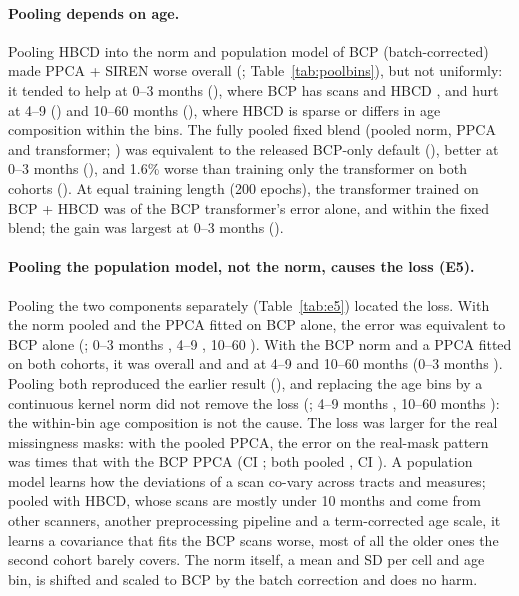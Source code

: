 \documentclass[11pt]{article}
\begin{document}
\paragraph{Pooling depends on age.} Pooling HBCD into the norm and population model of BCP (batch-corrected) made PPCA +
SIREN worse overall (\pbAAll; Table~\ref{tab:poolbins}), but not uniformly: it tended to help at 0--3 months (\pbAA),
where BCP has \bcpbinA{} scans and HBCD \hbcdbinA, and hurt at 4--9 (\pbAB) and 10--60 months (\pbAC), where HBCD is
sparse or differs in age composition within the bins. The fully pooled fixed blend (pooled norm, PPCA and transformer;
\rPooledBlend) was equivalent to the released BCP-only default (\pbBAll), better at 0--3 months (\pbBA), and 1.6\% worse
than training only the transformer on both cohorts (\pbCAll). At equal training length (200 epochs), the transformer
trained on BCP + HBCD was \pbDAll{} of the BCP transformer's error alone, and \pbEAll{} within the fixed blend; the gain
was largest at 0--3 months (\pbDA). 

\paragraph{Pooling the population model, not the norm, causes the loss (E5).} Pooling the two components separately
(Table~\ref{tab:e5}) located the loss. With the norm pooled and the PPCA fitted on BCP alone, the error was equivalent to
BCP alone (\eFiveA; 0--3 months \eFiveABinA, 4--9 \eFiveABinB, 10--60 \eFiveABinC). With the BCP norm and a PPCA fitted on
both cohorts, it was \eFiveB{} overall and \eFiveBBinB{} and \eFiveBBinC{} at 4--9 and 10--60 months (0--3 months
\eFiveBBinA). Pooling both reproduced the earlier result (\eFiveC), and replacing the age bins by a continuous kernel norm
did not remove the loss (\eFiveCK; 4--9 months \eFiveCKBinB, 10--60 months \eFiveCKBinC): the within-bin age composition
is not the cause. The loss was larger for the real missingness masks: with the pooled PPCA, the error on the real-mask
pattern was \eFiveRealB{} times that with the BCP PPCA (CI \eFiveRealBCi; both pooled \eFiveRealC, CI \eFiveRealCCi).
A population model learns how the deviations of a scan co-vary across tracts and measures; pooled with HBCD, whose scans
are mostly under 10 months and come from other scanners, another preprocessing pipeline and a term-corrected age scale,
it learns a covariance that fits the BCP scans worse, most of all the older ones the second cohort barely covers. The norm
itself, a mean and SD per cell and age bin, is shifted and scaled to BCP by the batch correction and does no harm.
\end{document}
